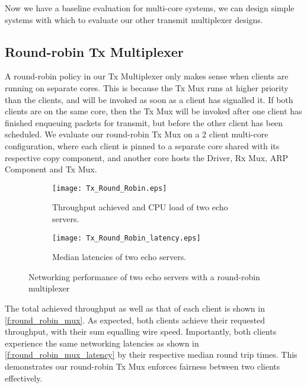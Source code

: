 Now we have a baseline evaluation for multi-core systems, we can design simple systems with which to evaluate our other transmit multiplexer
designs. 

\subsection{Round-robin Tx Multiplexer}

A round-robin policy in our Tx Multiplexer only makes sense when clients are running on separate cores. This is because the Tx Mux runs at higher
priority than the clients, and will be invoked as soon as a client has signalled it. If both clients are on the same core, then the Tx Mux will
be invoked after one client has finished enqueuing packets for transmit, but before the other client has been scheduled. We evaluate our round-robin
Tx Mux on a 2 client multi-core configuration, where each client is pinned to a separate core shared with its respective copy component, and another
core hosts the Driver, Rx Mux, ARP Component and Tx Mux. 

\noindent\begin{figure}[H]
    \centering
	\begin{multicols}{2}
		\begin{subfigure}[b]{0.45\textwidth}
        \centering
        \texttt{[image: Tx\_Round\_Robin.eps]}
        \caption{Throughput achieved and CPU load of two echo servers.}
        \label{f:round_robin_mux}
    \end{subfigure}\qquad
    \begin{subfigure}[b]{0.45\textwidth}
        \vspace{52pt}
        \centering
        \texttt{[image: Tx\_Round\_Robin\_latency.eps]}
        \vspace{0.5pt}
        \caption{Median latencies of two echo servers.}
        \label{f:round_robin_mux_latency}
    \end{subfigure}
\end{multicols}
\caption{Networking performance of two echo servers with a round-robin multiplexer}
\end{figure}

The total achieved throughput as well as that of each client is shown in \autoref{f:round_robin_mux}. As expected, both clients achieve their 
requested throughput, with their sum equalling wire speed. Importantly, both clients experience the same networking latencies as shown
in \autoref{f:round_robin_mux_latency} by their respective median round trip times. This demonstrates our round-robin Tx Mux enforces
fairness between two clients effectively.\\

